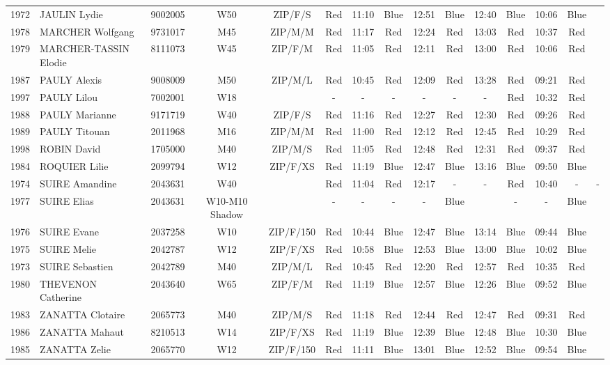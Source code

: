 \documentclass{report}
\begin{document}
\begin{longtable}{|c|l|r|c|c|*{5}{cc|}}
    1972 & JAULIN Lydie & 9002005 & W50 & ZIP/F/S & Red & 11:10 & Blue & 12:51 & Blue & 12:40 & Blue & 10:06 & Blue &  \\
    1978 & MARCHER Wolfgang & 9731017 & M45 & ZIP/M/M & Red & 11:17 & Red & 12:24 & Red & 13:03 & Red & 10:37 & Red &  \\
    1979 & MARCHER-TASSIN Elodie & 8111073 & W45 & ZIP/F/M & Red & 11:05 & Red & 12:11 & Red & 13:00 & Red & 10:06 & Red &  \\
    1987 & PAULY Alexis & 9008009 & M50 & ZIP/M/L & Red & 10:45 & Red & 12:09 & Red & 13:28 & Red & 09:21 & Red &  \\
    1997 & PAULY Lilou & 7002001 & W18 &   & - &  - & - &  - & - &  - & Red & 10:32 & Red &  \\
    1988 & PAULY Marianne & 9171719 & W40 & ZIP/F/S & Red & 11:16 & Red & 12:27 & Red & 12:30 & Red & 09:26 & Red &  \\
    1989 & PAULY Titouan & 2011968 & M16 & ZIP/M/M & Red & 11:00 & Red & 12:12 & Red & 12:45 & Red & 10:29 & Red &  \\
    1998 & ROBIN David & 1705000 & M40 & ZIP/M/S & Red & 11:05 & Red & 12:48 & Red & 12:31 & Red & 09:37 & Red &  \\
    1984 & ROQUIER Lilie & 2099794 & W12 & ZIP/F/XS & Red & 11:19 & Blue & 12:47 & Blue & 13:16 & Blue & 09:50 & Blue &  \\
    1974 & SUIRE Amandine & 2043631 & W40 &   & Red & 11:04 & Red & 12:17 & - &  - & Red & 10:40 & - &  -\\
    1977 & SUIRE Elias & 2043631 & W10-M10 Shadow &   & - &  - & - &  - & Blue &   & - &  - & Blue &  \\
    1976 & SUIRE Evane & 2037258 & W10 & ZIP/F/150 & Red & 10:44 & Blue & 12:47 & Blue & 13:14 & Blue & 09:44 & Blue &  \\
    1975 & SUIRE Melie & 2042787 & W12 & ZIP/F/XS & Red & 10:58 & Blue & 12:53 & Blue & 13:00 & Blue & 10:02 & Blue &  \\
    1973 & SUIRE Sebastien & 2042789 & M40 & ZIP/M/L & Red & 10:45 & Red & 12:20 & Red & 12:57 & Red & 10:35 & Red &  \\
    1980 & THEVENON Catherine & 2043640 & W65 & ZIP/F/M & Red & 11:19 & Blue & 12:57 & Blue & 12:26 & Blue & 09:52 & Blue &  \\
    1983 & ZANATTA Clotaire & 2065773 & M40 & ZIP/M/S & Red & 11:18 & Red & 12:44 & Red & 12:47 & Red & 09:31 & Red &  \\
    1986 & ZANATTA Mahaut & 8210513 & W14 & ZIP/F/XS & Red & 11:19 & Blue & 12:39 & Blue & 12:48 & Blue & 10:30 & Blue &  \\
    1985 & ZANATTA Zelie & 2065770 & W12 & ZIP/F/150 & Red & 11:11 & Blue & 13:01 & Blue & 12:52 & Blue & 09:54 & Blue &  \\
  \end{longtable}
\end{document}
